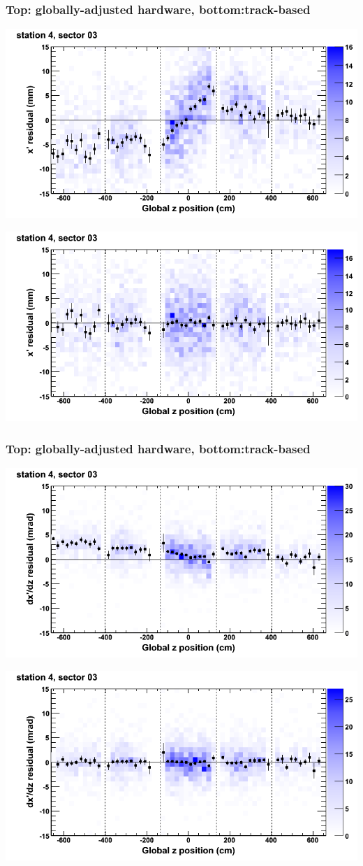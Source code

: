 \documentclass[compress]{beamer}
\begin{document}
\begin{frame}
\frametitle{Top: globally-adjusted hardware, bottom:track-based}
\includegraphics[width=0.7\linewidth]{NOV4_mapplots_HW/DTvsz_st4sec03_x.png}

\includegraphics[width=0.7\linewidth]{NOV4_mapplots/DTvsz_st4sec03_x.png}
\end{frame}

\begin{frame}
\frametitle{Top: globally-adjusted hardware, bottom:track-based}
\includegraphics[width=0.7\linewidth]{NOV4_mapplots_HW/DTvsz_st4sec03_dxdz.png}

\includegraphics[width=0.7\linewidth]{NOV4_mapplots/DTvsz_st4sec03_dxdz.png}
\end{frame}
\end{document}

